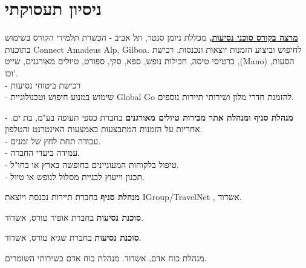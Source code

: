 %


\section{ניסיון תעסוקתי}

{\href{https://bit.ly/385JmIG}{
	\textbf{מרצה 
{בקורס סוכני נסיעות,}}}
מכללת ניומן סנטר, תל אביב}
{- הכשרת תלמידי הקורס בשימוש בתוכנות
Connect Amadeus Alp, Gilboa.
לחיפוש וביצוע הזמנות יוצאות ונכנסות, רכישת כרטיסי טיסה, חבילות נופש, ספא, סקי, ספורט, טיולים מאורגנים, שייט ,(Mano) הסעות, וכו'. \\
- רכישת ביטוחי נסיעות \\
- שימוש במנוע חיפוש וטכנולוגיית Global Go להזמנת חדרי מלון ושירותי תיירות נוספים.
}
{}

{\textbf{מנהלת סניף ומנהלת אתר מכירות טיולים מאורגנים }בחברת כספי תעופה בע"מ, בת ים.}
{
- אחריות על הזמנות המתבצעות באמצעות האינטרנט והטלפון.\\
- עבודה תחת לחץ של זמנים.\\
- עמידה ביעדי החברה.\\
- טיפול בלקוחות המעוניינים בחופשה בארץ או בחו"ל.\\
- תכנון וייעוץ לבניית מסלול לנופש או טיול.
}
{}

{\textbf{מנהלת סניף} בחברת תיירות נכנסת ויוצאת
	\setLTR IGroup/TravelNet \unsetLTR, אשדוד.}
{}
{}

{\textbf{סוכנת נסיעות} בחברת אופיר טורס, אשדוד.}
{}
{}

{\textbf{סוכנת נסיעות} בחברת שגיא טורס, אשדוד.}
{}
{}

{מנהלת כוח אדם, אשדוד.}
{מנהלת כוח אדם בשירותי השומרים.}
{}

